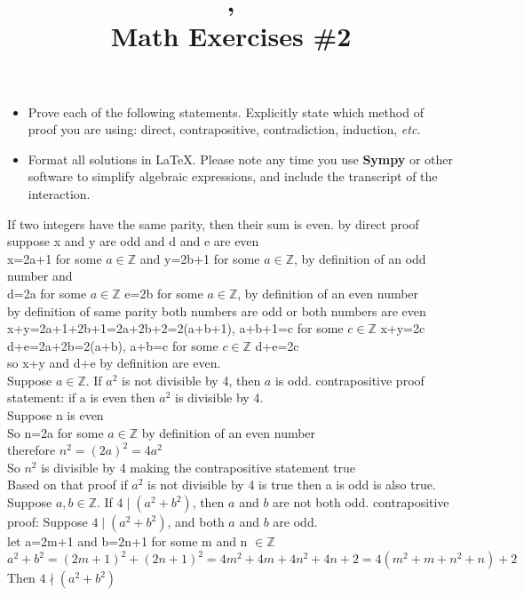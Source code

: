 \documentclass[12pt]{article}
\title{\course, \term\\Math Exercises \#2}
\begin{document}
\maketitle


\begin{itemize}
\item
Prove each of the following statements.  Explicitly state which method
of proof you are using: direct, contrapositive, contradiction,
induction, {\em etc.}
\item
Format all solutions in \LaTeX.
Please note any time you use {\bf Sympy} or
other software to simplify algebraic expressions, and include the
transcript of the interaction.
\end{itemize}


\question%
If two integers have the same parity, then their sum is even.
\answer by direct proof suppose x and y are odd and d and e are even \\
x=2a+1 for some $a\in\mathbb{Z}$ and y=2b+1 for some $a\in\mathbb{Z}$, by definition of an odd number and\\
d=2a for some $a\in\mathbb{Z}$ e=2b for some $a\in\mathbb{Z}$, by definition of an even number\\
by definition of same parity both numbers are odd or both numbers are even\\
x+y=2a+1+2b+1=2a+2b+2=2(a+b+1), a+b+1=c for some $c\in\mathbb{Z}$ x+y=2c\\ 
d+e=2a+2b=2(a+b), a+b=c for some $c\in\mathbb{Z}$ d+e=2c\\ 
so x+y and d+e by definition are even.\\
%


\question%
Suppose $a\in\mathbb{Z}$.  If $a^2$ is not divisible by 4, then $a$ is odd.
\answer contrapositive proof statement: if a is even then $a^2$ is divisible by 4.\\
Suppose n is even\\
So n=2a for some $a\in\mathbb{Z}$ by definition of an even number\\
therefore $n^2=(2a)^2=4a^2$\\
So $n^2$ is divisible by 4 making the contrapositive statement true\\
Based on that proof if $a^2$ is not divisible by 4 is true then a is odd is also true.
%
\newpage 
\question%
Suppose $a,b\in\mathbb{Z}$.  If $4\mid (a^2+b^2)$, then $a$ and $b$ are not both
odd.
\answer contrapositive proof: Suppose $4\mid (a^2+b^2)$, and both $a$ and $b$ are odd.\\
let a=2m+1 and b=2n+1 for some m and n $\in\mathbb{Z}$\\
$a^2+b^2=(2m+1)^2+(2n+1)^2=4m^2+4m+4n^2+4n+2=4(m^2+m+n^2+n)+2$\\
Then $4\nmid (a^2+b^2)$%
\end{document}
